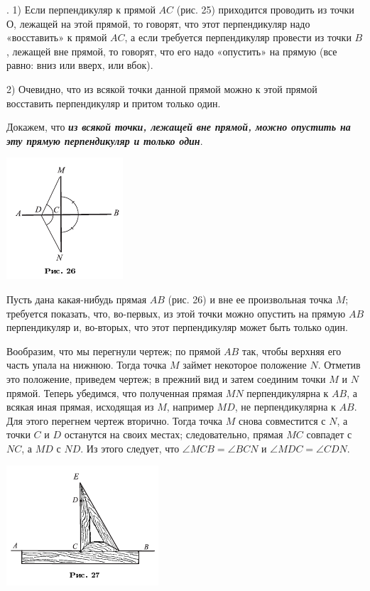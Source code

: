 \documentclass[oneside]{book}
\begin{document}
.
1) Если перпендикуляр к прямой $AC$ (рис. 25) приходится проводить из точки О, лежащей на этой прямой, то говорят, что этот перпендикуляр надо «восставить» к прямой $AC$, а если требуется перпендикуляр провести из точки $B$, лежащей вне прямой, то говорят, что его надо «опустить» на прямую (все равно:
вниз или вверх, или вбок).

2) Очевидно, что из всякой точки данной прямой можно к этой прямой восставить перпендикуляр и притом только один.

Докажем, что \textbf{\emph{из всякой точки, лежащей вне прямой, можно опустить на эту прямую перпендикуляр и только один}}.

\includegraphics{pics/ris-26}

Пусть дана какая-нибудь прямая $AB$ (рис. 26) и вне ее произвольная точка $M$;
требуется показать, что, во-первых, из этой точки можно опустить на прямую $AB$ перпендикуляр и, во-вторых, что этот перпендикуляр может быть только один.

Вообразим, что мы перегнули чертеж;
по прямой $AB$ так, чтобы верхняя его часть упала на нижнюю.
Тогда точка $M$ займет некоторое положение $N$.
Отметив это положение, приведем чертеж;
в прежний вид и затем соединим точки $M$ и $N$ прямой.
Теперь убедимся, что полученная прямая $MN$ перпендикулярна к $AB$, а всякая иная прямая, исходящая из $M$, например $MD$, не перпендикулярна к $AB$.
Для этого перегнем чертеж вторично.
Тогда точка $M$ снова совместится с $N$, а точки $C$ и $D$ останутся на своих местах;
следовательно, прямая $MC$ совпадет с $NC$, а $MD$ с $ND$.
Из этого следует, что $\angle MCB = \angle BCN$ и $\angle MDC = \angle CDN$.

\includegraphics{pics/ris-27}
\end{document}

